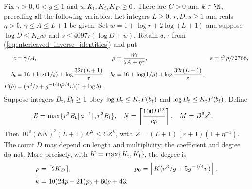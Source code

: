 \begin{lemma}
    \label{lem:interleaved_output_polynomial}
    \leanok
    Fix $\gamma>0$, $0<g\le1$ and $u,K_{\rm t},K_{\rm f},K_D\ge0$.
    There are $C>0$ and $k\in\N$, preceding all the following variables.
    Let integers $L\ge0$, $r,D,s\ge1$ and reals $\eta>0$,
    $\gamma\le A\le L+1$ be given. Set $w=1+\log r+2\log(L+1)$ and suppose
    $\log D\le K_Dw$ and $s\le4097r(\log D+w)$.
    Retain $a,\tau$ from (\ref{eq:interleaved_inverse_identities}) and put
    \begin{align}
        c           & =\gamma/A,                                          & \rho & =\frac{\eta\gamma}{2A+\eta\gamma}, &
        \varepsilon & =c^2\rho/32768,\notag                                                                             \\
        b_{\rm t}   & =16+\log(1/g)+\log\frac{32r(L+1)}\tau,              &
        b_{\rm f}   & =16+\log(1/g)+\log\frac{32r(L+1)}\varepsilon,\notag                                               \\
        F(b)        & =(u^3/g+g^{-1/4}b^{3/4}u)(1+\log b).
        \label{eq:interleaved_output_profiles}
    \end{align}
    Suppose integers $B_{\rm t},B_{\rm f}\ge1$ obey
    $\log B_{\rm t}\le K_{\rm t}F(b_{\rm t})$ and
    $\log B_{\rm f}\le K_{\rm f}F(b_{\rm f})$. Define
    \begin{align}
        E & =\max\{r^2B_{\rm t}\lceil a^{-1}\rceil,r^2B_{\rm f}\}, &
        N & =\left\lceil\frac{100D^{12}}{c\rho}\right\rceil,       & M & =D^6s^3.
        \label{eq:interleaved_output_common_costs}
    \end{align}
    Then $10^6(EN)^2(L+1)M^2\le CZ^k$, with
    $Z=(L+1)(r+1)(1+\eta^{-1})$. The count $D$ may depend on length and
    multiplicity; the coefficient and degree do not. More precisely, with
    $K=\max\{K_{\rm t},K_{\rm f}\}$, the degree is
    \begin{align}
        p   & =\lceil2K_D\rceil,                                  &
        p_0 & =\left\lceil K(u^3/g+5g^{-1/4}u)\right\rceil,\notag   \\
        k   & =10(24p+21)p_0+60p+43.
        \label{eq:interleaved_output_exact_degree}
    \end{align}
\end{lemma}
